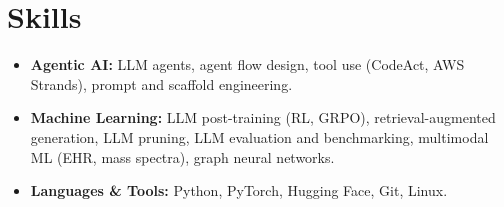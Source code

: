 \documentclass[letterpaper,11pt]{article}
\newcommand{\resumeItem}[1]{
  \item\small{
    {#1 \vspace{-1pt}}
  }
}
\newcommand{\resumeItemListStart}{\begin{itemize}}
\newcommand{\resumeItemListEnd}{\end{itemize}\vspace{0pt}}
\begin{document}
  \section{Skills}
  \begin{itemize}[leftmargin=0in, label={}, itemsep=4pt, parsep=0pt, topsep=0pt]
    \item \small{\textbf{Agentic AI:} LLM agents, agent flow design, tool use (CodeAct, AWS Strands), prompt and scaffold engineering.}
    \item \small{\textbf{Machine Learning:} LLM post-training (RL, GRPO), retrieval-augmented generation, LLM pruning, LLM evaluation and benchmarking, multimodal ML (EHR, mass spectra), graph neural networks.}
    \item \small{\textbf{Languages \& Tools:} Python, PyTorch, Hugging Face, Git, Linux.}
  \end{itemize}
\end{document}
